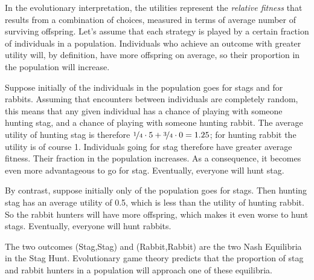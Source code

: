 In the evolutionary interpretation, the utilities represent the
\emph{relative fitness} that results from a combination of choices,
measured in terms of average number of surviving offspring. Let's
assume that each strategy is played by a certain fraction of
individuals in a population. Individuals who achieve an outcome with
greater utility will, by definition, have more offspring on average,
so their proportion in the population will increase.

Suppose initially  of the individuals in the population
goes for stags and  for rabbits. Assuming that
encounters between individuals are completely random, this means that
any given individual has a  chance of playing with
someone hunting stag, and a  chance of playing with
someone hunting rabbit. The average utility of hunting stag is
therefore $\nicefrac{1}{4} \cdot 5 + \nicefrac{3}{4} \cdot 0 = 1.25$;
for hunting rabbit the utility is of course 1. Individuals going for
stag therefore have greater average fitness. Their fraction in the
population increases. As a consequence, it becomes even more
advantageous to go for stag. Eventually, everyone will hunt stag.

By contrast, suppose initially only  of the population
goes for stags. Then hunting stag has an average utility of 0.5, which
is less than the utility of hunting rabbit. So the rabbit hunters will
have more offspring, which makes it even worse to hunt
stags. Eventually, everyone will hunt rabbits.

The two outcomes (Stag,Stag) and (Rabbit,Rabbit) are the two Nash
Equilibria in the Stag Hunt. Evolutionary game theory predicts that
the proportion of stag and rabbit hunters in a population will
approach one of these equilibria. 


